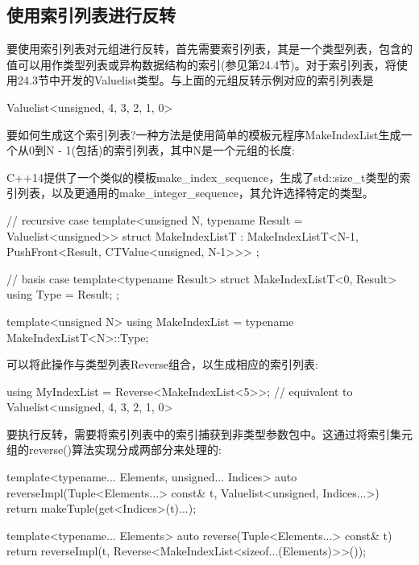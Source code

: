 \subsection{使用索引列表进行反转}

要使用索引列表对元组进行反转，首先需要索引列表，其是一个类型列表，包含的值可以用作类型列表或异构数据结构的索引(参见第24.4节)。对于索引列表，将使用24.3节中开发的Valuelist类型。与上面的元组反转示例对应的索引列表是

\begin{cpp}
Valuelist<unsigned, 4, 3, 2, 1, 0>
\end{cpp}

要如何生成这个索引列表?一种方法是使用简单的模板元程序MakeIndexList生成一个从0到N - 1(包括)的索引列表，其中N是一个元组的长度:

\begin{notice}
C++14提供了一个类似的模板make\_index\_sequence，生成了std::size\_t类型的索引列表，以及更通用的make\_integer\_sequence，其允许选择特定的类型。
\end{notice}

\begin{cpp}
// recursive case
template<unsigned N, typename Result = Valuelist<unsigned>>
struct MakeIndexListT
: MakeIndexListT<N-1, PushFront<Result, CTValue<unsigned, N-1>>>
{
};

// basis case
template<typename Result>
struct MakeIndexListT<0, Result>
{
	using Type = Result;
};

template<unsigned N>
using MakeIndexList = typename MakeIndexListT<N>::Type;
\end{cpp}

可以将此操作与类型列表Reverse组合，以生成相应的索引列表:

\begin{cpp}
using MyIndexList = Reverse<MakeIndexList<5>>;
					// equivalent to Valuelist<unsigned, 4, 3, 2, 1, 0>
\end{cpp}

要执行反转，需要将索引列表中的索引捕获到非类型参数包中。这通过将索引集元组的reverse()算法实现分成两部分来处理的:

\begin{cpp}
template<typename... Elements, unsigned... Indices>
auto reverseImpl(Tuple<Elements...> const& t,
Valuelist<unsigned, Indices...>)
{
	return makeTuple(get<Indices>(t)...);
}

template<typename... Elements>
auto reverse(Tuple<Elements...> const& t)
{
	return reverseImpl(t,
	Reverse<MakeIndexList<sizeof...(Elements)>>());
}
\end{cpp}

